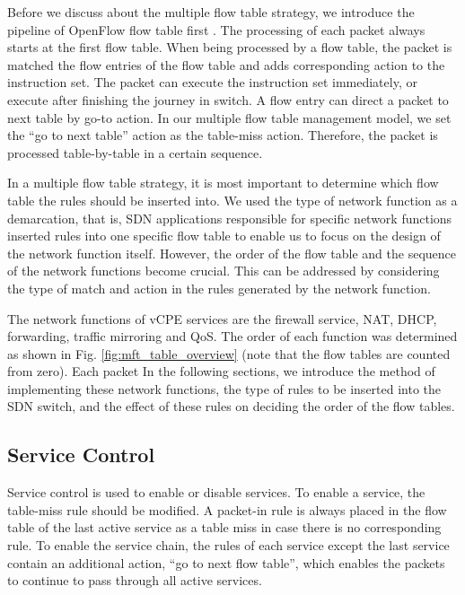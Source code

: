 \documentclass[conference]{IEEEtran}
\begin{document}
Before we discuss about the multiple flow table strategy, we introduce the pipeline of OpenFlow flow table first \cite{sp:openflow13}. The processing of each packet always starts at the first flow table. When being processed by a flow table, the packet is matched the flow entries of the flow table and adds corresponding action to the instruction set. The packet can execute the instruction set immediately, or execute after finishing the journey in switch. A flow entry can direct a packet to next table by go-to action. In our multiple flow table management model, we set the ``go to next table'' action as the table-miss action. Therefore, the packet is processed table-by-table in a certain sequence.

In a multiple flow table strategy, it is most important to determine which flow table the rules should be inserted into. We used the type of network function as a demarcation, that is, SDN applications responsible for specific network functions inserted rules into one specific flow table to enable us to focus on the design of the network function itself. However, the order of the flow table and the sequence of the network functions become crucial. This can be addressed by considering the type of match and action in the rules generated by the network function.

The network functions of vCPE services are the firewall service, NAT, DHCP, forwarding, traffic mirroring and QoS. The order of each function was determined as shown in Fig. \ref{fig:mft_table_overview} (note that the flow tables are counted from zero). Each packet In the following sections, we introduce the method of implementing these network functions, the type of rules to be inserted into the SDN switch, and the effect of these rules on deciding the order of the flow tables.



\subsection{Service Control}
Service control is used to enable or disable services. To enable a service, the table-miss rule should be modified. A packet-in rule is always placed in the flow table of the last active service as a table miss in case there is no corresponding rule. To enable the service chain, the rules of each service except the last service contain an additional action, ``go to next flow table'', which enables the packets to continue to pass through all active services.
\end{document}
